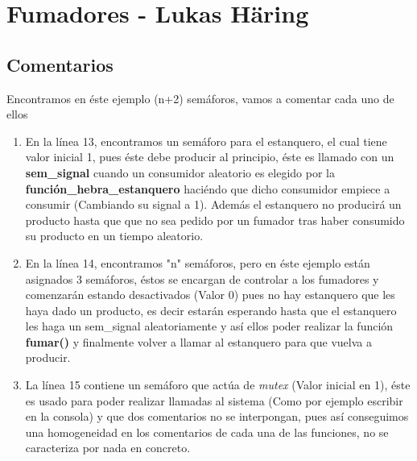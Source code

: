 \documentclass[8pt, a4paper, titlepage]{article}
\begin{document}
   \section{Fumadores - Lukas Häring}
   		\subsection{Comentarios}
   		Encontramos en éste ejemplo (n+2) semáforos, vamos a comentar cada uno de ellos
   		\begin{enumerate}
   			\item En la línea 13, encontramos un semáforo para el estanquero, el cual tiene valor inicial 1, pues éste debe producir al principio, éste es llamado con un \textbf{sem\_signal} cuando un consumidor aleatorio es elegido por la  \textbf{función\_hebra\_estanquero} haciéndo que dicho consumidor empiece a consumir (Cambiando su signal a 1). Además el estanquero no producirá un producto hasta que que no sea pedido por un fumador tras haber consumido su producto en un tiempo aleatorio.
   			\item En la línea 14, encontramos "n" semáforos, pero en éste ejemplo están asignados 3 semáforos, éstos se encargan de controlar a los fumadores y comenzarán estando desactivados (Valor 0) pues no hay estanquero que les haya dado un producto, es decir estarán esperando hasta que el estanquero les haga un sem\_signal aleatoriamente y así ellos poder realizar la función \textbf{fumar()} y finalmente volver a llamar al estanquero para que vuelva a producir.
   			\item La línea 15 contiene un semáforo que actúa de \textit{mutex} (Valor inicial en 1), éste es usado para poder realizar llamadas al sistema (Como por ejemplo escribir en la consola) y que dos comentarios no se interpongan, pues así conseguimos una homogeneidad en los comentarios de cada una de las funciones, no se caracteriza por nada en concreto.
   		\end{enumerate}
\end{document}
